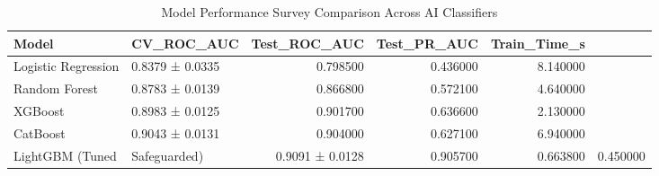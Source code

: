 \begin{table}
\caption{Model Performance Survey Comparison Across AI Classifiers}
\label{tab:model_survey}
\begin{tabular}{llrrr}
\toprule
Model & CV_ROC_AUC & Test_ROC_AUC & Test_PR_AUC & Train_Time_s \\
\midrule
Logistic Regression & 0.8379 ± 0.0335 & 0.798500 & 0.436000 & 8.140000 \\
Random Forest & 0.8783 ± 0.0139 & 0.866800 & 0.572100 & 4.640000 \\
XGBoost & 0.8983 ± 0.0125 & 0.901700 & 0.636600 & 2.130000 \\
CatBoost & 0.9043 ± 0.0131 & 0.904000 & 0.627100 & 6.940000 \\
LightGBM (Tuned & Safeguarded) & 0.9091 ± 0.0128 & 0.905700 & 0.663800 & 0.450000 \\
\bottomrule
\end{tabular}
\end{table}
